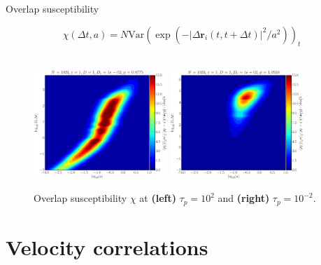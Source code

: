 \documentclass{beamer}
\begin{document}
\begin{frame}{Overlap susceptibility}

\begin{equation}
\chi(\Delta t, a) = N \mathrm{Var}\left(\exp\left(-|\Delta \boldsymbol{r}_i(t, t + \Delta t)|^2/a^2\right)\right)_t
\end{equation}
\mbox{}\\

\begin{figure}
\centering
\includegraphics[width=0.45\textwidth]{No1024_Fl1000_Vl0000_Tl1000_Rj1000_Dk8775_El0000.datN.overlap.eps}
\includegraphics[width=0.45\textwidth]{No1024_Fl1000_Vl0000_Tl1000_Rn1000_Dl1055_El0000.datN.overlap.eps}
\caption{Overlap susceptibility $\chi$ at {\bf (left)} $\tau_p = 10^2$ and {\bf (right)} $\tau_p = 10^{-2}$.}
\end{figure}

\end{frame}

\section{Velocity correlations}
\end{document}
